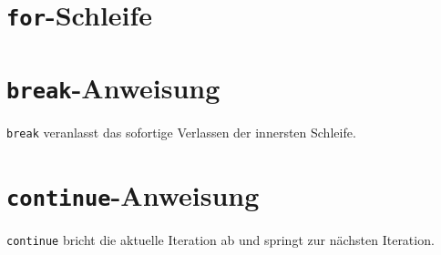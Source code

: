\section{\texttt{for}-Schleife}


\section{\texttt{break}-Anweisung}
\texttt{break} veranlasst das sofortige Verlassen der innersten Schleife.

\section{\texttt{continue}-Anweisung}
\texttt{continue} bricht die aktuelle Iteration ab und springt zur nächsten Iteration.
